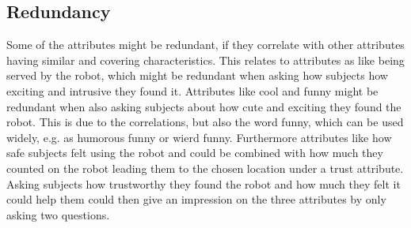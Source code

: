 \subsection{Redundancy}
%
Some of the attributes might be redundant, if they correlate with other attributes having similar and covering characteristics. This relates to attributes as like being served by the robot, which might be redundant when asking how subjects how exciting and intrusive they found it. Attributes like cool and funny might be redundant when also asking subjects about how cute and exciting they found the robot. This is due to the correlations, but also the word funny, which can be used widely, e.g. as humorous funny or wierd funny. Furthermore attributes like how safe subjects felt using the robot and could be combined with how much they counted on the robot leading them to the chosen location under a trust attribute. Asking subjects how trustworthy they found the robot and how much they felt it could help them could then give an impression on the three attributes by only asking two questions.